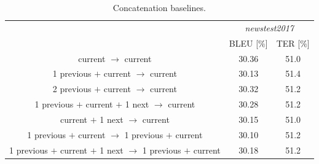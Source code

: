 \documentclass[11pt, a4paper, landscape]{article}
\begin{document}
\NewPage
{}
\vfill
\begin{table}
  \small
  \bf
  \caption{Concatenation baselines.}
  \begin{center}
    \begin{tabular}{c||cc}
      & \multicolumn{2}{c}{\textit{newstest2017}} \\
      & BLEU [$\%$] & TER [$\%$] \\
      \toprule
      \toprule
      \phantom{1 previous $+$ }current\phantom{ $+$ 1 next} $\to$ \phantom{1 previous $+$ }current & \alert{30.36} & \alert{51.0} \\
      \midrule
      1 previous $+$ current\phantom{ $+$ 1 next} $\to$ \phantom{1 previous $+$ }current & 30.13 & 51.4 \\
      2 previous $+$ current\phantom{ $+$ 1 next} $\to$ \phantom{1 previous $+$ }current & 30.32 & 51.2 \\
      1 previous $+$ current $+$ 1 next $\to$ \phantom{1 previous $+$ }current & 30.28 & 51.2 \\
      \phantom{1 previous $+$ }current $+$ 1 next $\to$ \phantom{1 previous $+$ }current & 30.15 & 51.0 \\
      \midrule
      1 previous $+$ current\phantom{ $+$ 1 next} $\to$ 1 previous $+$ current & 30.10 & 51.2 \\
      1 previous $+$ current $+$ 1 next $\to$ 1 previous $+$ current & 30.18 & 51.2
\end{tabular}
  \end{center}
\end{table}
\vfill
\end{document}
